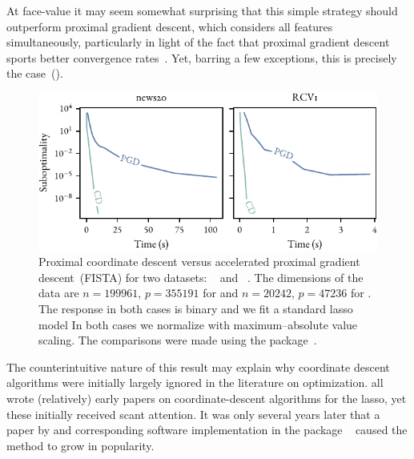 At face-value it may seem somewhat surprising that this simple strategy should outperform proximal gradient descent, which considers all features simultaneously, particularly in light of the fact that proximal gradient descent sports better convergence rates~\parencite{wright2015}. Yet, barring a few exceptions, this is precisely the case~().

\begin{figure}[htpb]
  \centering
  \includegraphics[]{figures/cd-vs-pgd.pdf}
  \caption{%
    Proximal coordinate descent versus accelerated proximal gradient descent~(FISTA) for two datasets: ~\parencite{lang1995} and ~\parencite{lewis2004}. The dimensions of the data are $n=\num{199961}$, $p=\num{355191}$ for  and $n = \num{20242}$,  $p=\num{47236}$ for . The response in both cases is binary and we fit a standard lasso model In both cases we normalize with maximum--absolute value scaling. The comparisons were made using the  package~\parencite{moreau2022a}.
  }
  \label{fig:cd-vs-pgd}
\end{figure}

The counterintuitive nature of this result may explain why coordinate descent algorithms were initially largely ignored in the literature on optimization. \textcite{shevade2003,fu1998a, daubechies2004} all wrote (relatively) early papers on coordinate-descent algorithms for the lasso, yet these initially received scant attention. It was only several years later that a paper by \textcite{friedman2007} and corresponding software implementation in the  package ~\parencite{friedman2010} caused the method to grow in popularity.

